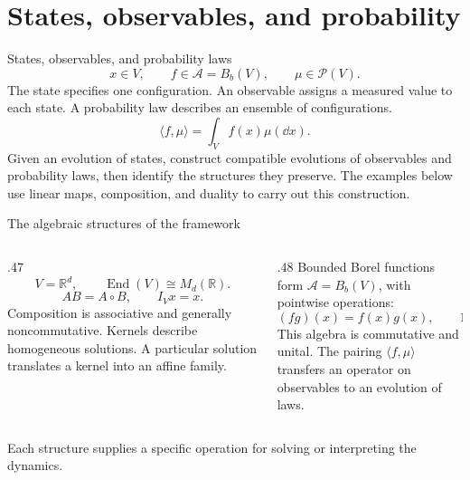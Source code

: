 \section[Framework]{States, observables, and probability}

\begin{frame}[t]{States, observables, and probability laws}
\hypertarget{main:framework}{}
\begin{equation*}
  x\in V,\qquad f\in\mathcal A=B_b(V),\qquad \mu\in\mathcal P(V).
\end{equation*}
The state specifies one configuration. An observable assigns a measured value
to each state. A probability law describes an ensemble of configurations.
\begin{equation*}
  \langle f,\mu\rangle=\int_V f(x)\mu(\dd x).
\end{equation*}
Given an evolution of states, construct compatible evolutions of observables
and probability laws, then identify the structures they preserve.
\medskip
The examples below use linear maps, composition, and duality to carry out this construction.
\end{frame}

\begin{frame}[t]{The algebraic structures of the framework}
\hypertarget{main:states}{}\hypertarget{main:algebras}{}
\begin{columns}[T,onlytextwidth]
  \begin{column}{.47\textwidth}
    \begin{equation*}
      V=\mathbb R^d,\qquad \operatorname{End}(V)\cong M_d(\mathbb R).
    \end{equation*}
    \begin{equation*}
      AB=A\circ B,\qquad I_Vx=x.
    \end{equation*}
    Composition is associative and generally noncommutative.
    Kernels describe homogeneous solutions. A particular solution translates a kernel into an affine family.
  \end{column}
  \begin{column}{.48\textwidth}
    Bounded Borel functions form $\mathcal A=B_b(V)$, with pointwise operations:
    \begin{equation*}
      (fg)(x)=f(x)g(x),\qquad 1(x)=1.
    \end{equation*}
    This algebra is commutative and unital.
    The pairing $\langle f,\mu\rangle$ transfers an operator on observables to an evolution of laws.
  \end{column}
\end{columns}
\medskip
Each structure supplies a specific operation for solving or interpreting the dynamics.
\end{frame}

